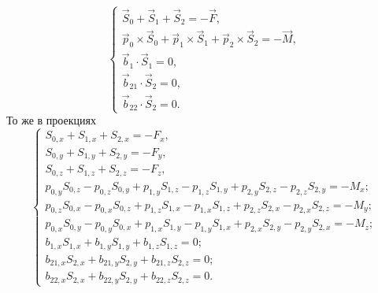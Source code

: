 \begin{equation}
\left\{
	\begin{gathered}
		\vec{S}_0 + \vec{S}_1 + \vec{S}_2 = -\vec{F},\\
		\vec{p}_0 \times \vec{S}_0 + \vec{p}_1 \times \vec{S}_1 + \vec{p}_2 \times \vec{S}_2 = -\vec{M},\\
		\vec b_1 \cdot \vec S_1 = 0,\\
		\vec b_{21} \cdot \vec S_2 = 0,\\
		\vec b_{22} \cdot \vec S_2 = 0.
	\end{gathered}
\right.
\end{equation}
То же в проекциях
\begin{equation}
\left\{
	\begin{gathered}
		S_{0,x} + S_{1,x} + S_{2,x} = -F_x,\\
		S_{0,y} + S_{1,y} + S_{2,y} = -F_y,\\
		S_{0,z} + S_{1,z} + S_{2,z} = -F_z,\\
		p_{0,y}S_{0,z} - p_{0,z} S_{0,y} +	p_{1,y}S_{1,z} - p_{1,z} S_{1,y} + p_{2,y}S_{2,z} - p_{2,z} S_{2,y} = - M_x;\\
		p_{0,z}S_{0,x} - p_{0,x} S_{0,z} +	p_{1,z}S_{1,x} - p_{1,x} S_{1,z} + p_{2,z}S_{2,x} - p_{2,x} S_{2,z} = - M_y;\\
		p_{0,x}S_{0,y} - p_{0,y} S_{0,x} +	p_{1,x}S_{1,y} - p_{1,y} S_{1,x} + p_{2,x}S_{2,y} - p_{2,y} S_{2,x} = - M_z;\\
		b_{1,x}S_{1,x} + b_{1,y}S_{1,y} + b_{1,z}S_{1,z} = 0;\\
		b_{21,x}S_{2,x} + b_{21,y}S_{2,y} + b_{21,z}S_{2,z} = 0;\\
		b_{22,x}S_{2,x} + b_{22,y}S_{2,y} + b_{22,z}S_{2,z} = 0.
	\end{gathered}
\right.
\end{equation}


